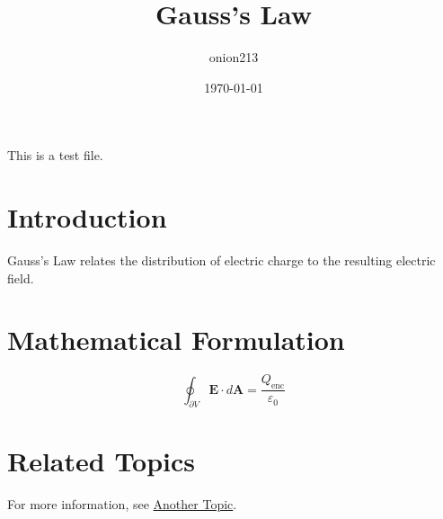 \documentclass{article}
\title{Gauss's Law}
\author{onion213}
\date{\today}
\begin{document}
\maketitle

This is a test file.

\section{Introduction}

Gauss's Law relates the distribution of electric charge to the resulting electric field.

\section{Mathematical Formulation}

\begin{equation}
\oint_{\partial V} \mathbf{E} \cdot d\mathbf{A} = \frac{Q_{\text{enc}}}{\varepsilon_0}
\end{equation}

\section{Related Topics}

For more information, see \href{../another/file.tex}{Another Topic}.
\end{document}
